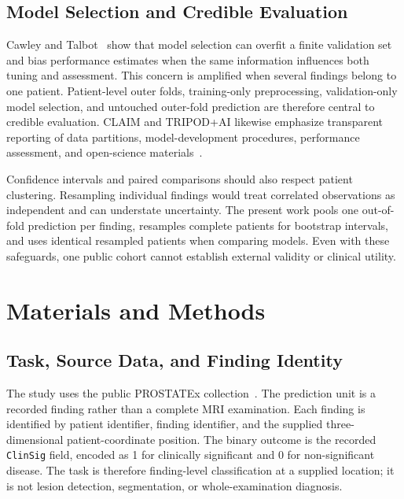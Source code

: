 \documentclass[11pt]{article}
\begin{document}
\subsection{Model Selection and Credible Evaluation}\label{sec:2.5}

Cawley and Talbot~\cite{selection-bias} show that model selection can overfit a finite validation set and bias performance estimates when the same information influences both tuning and assessment. This concern is amplified when several findings belong to one patient. Patient-level outer folds, training-only preprocessing, validation-only model selection, and untouched outer-fold prediction are therefore central to credible evaluation. CLAIM and TRIPOD+AI likewise emphasize transparent reporting of data partitions, model-development procedures, performance assessment, and open-science materials~\cite{claim,tripod-ai}.

Confidence intervals and paired comparisons should also respect patient clustering. Resampling individual findings would treat correlated observations as independent and can understate uncertainty. The present work pools one out-of-fold prediction per finding, resamples complete patients for bootstrap intervals, and uses identical resampled patients when comparing models. Even with these safeguards, one public cohort cannot establish external validity or clinical utility.

\section{Materials and Methods}\label{sec:3}

\subsection{Task, Source Data, and Finding Identity}\label{sec:3.1}

The study uses the public PROSTATEx collection~\cite{prostatex}. The prediction unit is a recorded finding rather than a complete MRI examination. Each finding is identified by patient identifier, finding identifier, and the supplied three-dimensional patient-coordinate position. The binary outcome is the recorded \texttt{ClinSig} field, encoded as 1 for clinically significant and 0 for non-significant disease. The task is therefore finding-level classification at a supplied location; it is not lesion detection, segmentation, or whole-examination diagnosis.
\end{document}
